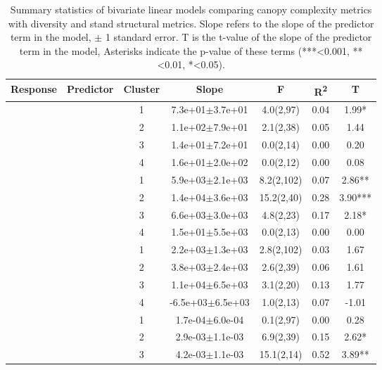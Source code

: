 \setlength{\tabcolsep}{4pt}
\begin{longtable}{llccccS[table-format=-2.2, table-space-text-post = {***}]}
\caption{Summary statistics of bivariate linear models comparing canopy complexity metrics with diversity and stand structural metrics. Slope refers to the slope of the predictor term in the model, $\pm{}$ 1 standard error.  T is the t-value of the slope of the predictor term in the model, Asterisks indicate the p-value of these terms (***<0.001, **<0.01, *<0.05).} \\ 
  \toprule
{Response} & {Predictor} & {Cluster} & {Slope} & {F} & {R\textsuperscript{2}} & {T} \\ 
  \midrule
{} & {} & 1 &  7.3e+01$\pm$3.7e+01 & 4.0(2,97) & 0.04 & 1.99* \\ 
   &  & 2 &  1.1e+02$\pm$7.9e+01 & 2.1(2,38) & 0.05 & 1.44 \\ 
   &  & 3 &  1.4e+01$\pm$7.2e+01 & 0.0(2,14) & 0.00 & 0.20 \\ 
   &  & 4 &  1.6e+01$\pm$2.0e+02 & 0.0(2,12) & 0.00 & 0.08 \\ 
   \midrule
{} & {} & 1 &  5.9e+03$\pm$2.1e+03 & 8.2(2,102) & 0.07 & 2.86** \\ 
   &  & 2 &  1.4e+04$\pm$3.6e+03 & 15.2(2,40) & 0.28 & 3.90*** \\ 
   &  & 3 &  6.6e+03$\pm$3.0e+03 & 4.8(2,23) & 0.17 & 2.18* \\ 
   &  & 4 &  1.5e+01$\pm$5.5e+03 & 0.0(2,13) & 0.00 & 0.00 \\ 
   \midrule
{} & {} & 1 &  2.2e+03$\pm$1.3e+03 & 2.8(2,102) & 0.03 & 1.67 \\ 
   &  & 2 &  3.8e+03$\pm$2.4e+03 & 2.6(2,39) & 0.06 & 1.61 \\ 
   &  & 3 &  1.1e+04$\pm$6.5e+03 & 3.1(2,20) & 0.13 & 1.77 \\ 
   &  & 4 & -6.5e+03$\pm$6.5e+03 & 1.0(2,13) & 0.07 & -1.01 \\ 
   \midrule
{} & {} & 1 &  1.7e-04$\pm$6.0e-04 & 0.1(2,97) & 0.00 & 0.28 \\ 
   &  & 2 &  2.9e-03$\pm$1.1e-03 & 6.9(2,39) & 0.15 & 2.62* \\ 
   &  & 3 &  4.2e-03$\pm$1.1e-03 & 15.1(2,14) & 0.52 & 3.89** \\ 

\end{longtable}
